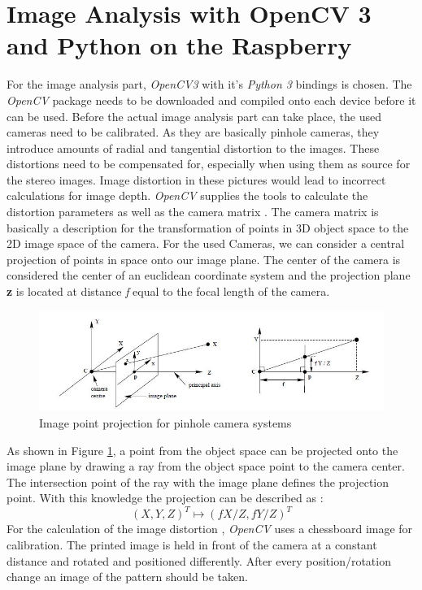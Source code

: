 \section{Image Analysis with OpenCV 3 and Python on the Raspberry}
For the image analysis part, \textit{OpenCV3} with it's \textit{Python 3} bindings is chosen. The \textit{OpenCV} package needs to be downloaded and compiled onto each device before it can be used.
Before the actual image analysis part can take place, the used cameras need to be calibrated. As they are basically pinhole cameras, they introduce amounts of radial and tangential distortion to the images. These distortions need to be compensated for, especially when using them as source for the stereo images. Image distortion in these pictures would lead to incorrect calculations for image depth.
\textit{OpenCV} supplies the tools to calculate the distortion parameters as well as the camera matrix \cite{Opencv.2018}.
The camera matrix is basically a description for the transformation of points in 3D object space to the 2D image space of the camera. For the used Cameras, we can consider a central projection of points in space onto our image plane. The center of the camera is considered the center of an euclidean coordinate system and the projection plane \textbf{z} is located at distance \textit{f} equal to the focal length of the camera.
\begin{figure}[H]
\includegraphics[width=\textwidth]{images/pionhole.JPG}
\caption{Image point projection for pinhole camera systems\cite{Hartley.2000}}
\label{pinholecamera_mapping} 
\end{figure}
As shown in Figure \ref{pinholecamera_mapping}, a point from the object space can be projected onto the image plane by drawing a ray from the object space point to the camera center. The intersection point of the ray with the image plane defines the projection point. With this knowledge the projection can be described as :
\begin{equation}
(X,Y,Z)^{T} \mapsto (fX/Z,fY/Z)^{T}
\end{equation}
For the calculation of the image distortion , \textit{OpenCV} uses a chessboard image for calibration. The printed image is held in front of the camera at a constant distance and rotated and positioned differently. After every position/rotation change an image of the pattern should be taken.
